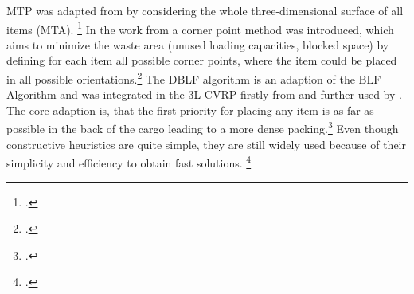 \gls{MTP} was adapted from \cite{tarantilis_hybrid_2009} by considering the whole three-dimensional
surface of all items (\gls{MTA}). \footcite[cf.][pp. 258-260]{tarantilis_hybrid_2009}
In the work from \cite{tao_effective_2015} a corner point method
was introduced, which aims to minimize the waste area (unused loading capacities, blocked space) by
defining for each item all possible corner points, where the item could be placed in all possible
orientations.\footcite[cf.][pp. 130-132]{tao_effective_2015} The \gls{DBLF} algorithm
is an adaption of the \gls{BLF} Algorithm and was integrated in the \gls{3L-CVRP} firstly from \cite{wang_two_2010}
and further used by \cite{krebs_advanced_2021}.
The core adaption is, that the first priority for placing any item is as far as possible in the back of the cargo
leading to a more dense packing.\footcites[cf.][pp. 259-263]{wang_two_2010}[cf.][pp. 8-9]{krebs_axle_2021}
Even though constructive heuristics are quite simple, they are still widely used because of their simplicity and efficiency to obtain fast solutions.
\footcite[cf.][pp. 11--13]{tamke_branch-and-cut_2024}

